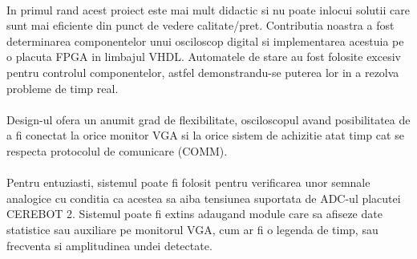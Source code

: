 \documentclass[10pt,a4paper]{article}
\begin{document}
\paragraph{}
In primul rand acest proiect este mai mult didactic si nu poate inlocui solutii care sunt mai eficiente din punct de vedere calitate/pret. Contributia noastra a fost determinarea componentelor unui osciloscop digital si implementarea acestuia pe o placuta FPGA in limbajul VHDL. Automatele de stare au fost folosite excesiv pentru controlul componentelor, astfel demonstrandu-se puterea lor in a rezolva probleme de timp real.
\paragraph{}
Design-ul ofera un anumit grad de flexibilitate, osciloscopul avand posibilitatea de a fi conectat la orice monitor VGA si la orice sistem de achizitie atat timp cat se respecta protocolul de comunicare (COMM).
\paragraph{}
Pentru entuziasti, sistemul poate fi folosit pentru verificarea unor semnale analogice cu conditia ca acestea sa aiba tensiunea suportata de ADC-ul placutei CEREBOT 2. Sistemul poate fi extins adaugand module care sa afiseze date statistice sau auxiliare pe monitorul VGA, cum ar fi o legenda de timp, sau frecventa si amplitudinea undei detectate.


\end{document}
